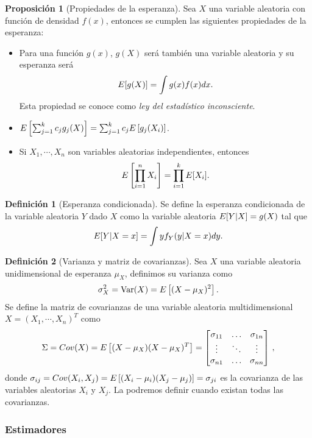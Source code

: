 \documentclass[10pt,a4paper]{article} %
\let\mathbb\relax
\newcommand{\Var}{\text{Var}}
\theoremstyle{definition}
\newtheorem{definition}{Definición}[section]
\newtheorem{proposition}[theorem]{Proposición}
\begin{document}
\begin{proposition}[Propiedades de la esperanza]
  Sea $X$ una variable aleatoria con función de densidad $f(x)$, entonces se cumplen las siguientes propiedades de la esperanza:
  \begin{itemize}
  \item Para una función $g(x)$, $g(X)$ será también una variable aleatoria y su esperanza será\[
\mathbb{E}[g(X)] = \int g(x)f(x)dx.
\]
Esta propiedad se conoce como \textit{ley del estadístico inconsciente}.
\item $\mathbb{E}\left [\sum_{j=1}^kc_jg_j(X) \right] = \sum_{j=1}^k c_j \mathbb{E} \left [ g_j(X_i) \right ]$.

\item Si $X_1,\cdots,X_n$ son variables aleatorias independientes, entonces\[
\mathbb{E} \left [ \prod_{i=1}^n X_i \right ] = \prod_{i=1}^k\mathbb{E}[X_i].
  \]
  \end{itemize}
  
\end{proposition}
\begin{definition}[Esperanza condicionada]
  Se define la esperanza condicionada de la variable aleatoria $Y$ dado $X$ como la variable aleatoria $\mathbb{E}[Y|X] = g(X)$ tal que \[
\mathbb{E} [ Y | X = x ] = \int y f_Y(y| X = x) dy.
  \] 
  
\end{definition}
\begin{definition}[Varianza y matriz de covarianzas]
  Sea $X$ una variable aleatoria unidimensional de esperanza $\mu_X$, definimos su varianza como\[
\sigma_X^2 = \Var(X) = \mathbb{E}\left [ (X- \mu_X)^2 \right ].
  \]
  Se define la matriz de covarianzas de una variable aleatoria multidimensional $X= (X_1,\cdots,X_n)^T$ como\[
\Sigma = Cov(X) = \mathbb{E}\left [(X-\mu_X)(X-\mu_X)^T \right ] =  \begin{bmatrix} \sigma_{11} & \dots & \sigma_{1n} \\ \vdots& \ddots & \vdots \\ \sigma_{n1} &  \dots & \sigma_{nn}\end{bmatrix}\,,
\]
donde $\sigma_{ij} = Cov(X_i, X_j) = \mathbb{E}\left[(X_i-\mu_i)(X_j-\mu_j)\right]=\sigma_{ji}$ es la covarianza de las variables aleatorias $X_i$ y $X_j$. La podremos definir cuando existan todas las covarianzas.  
\end{definition}

\subsubsection{Estimadores}
\end{document}
